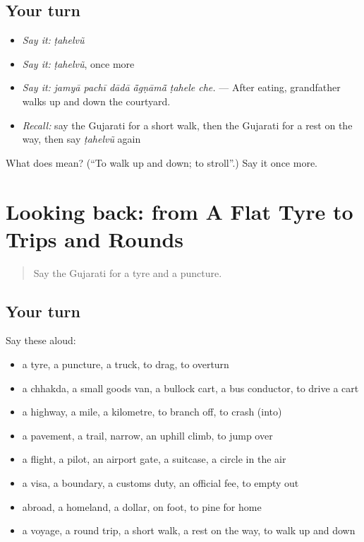\subsection*{Your turn}
\begin{itemize}
\raggedright
  \item \emph{Say it:} \emph{ṭahelvũ}
  \item \emph{Say it:} \emph{ṭahelvũ}, once more
  \item \emph{Say it:} \emph{jamyā pachī dādā ā̃gṇāmā̃ ṭahele che.} — After eating, grandfather walks up and down the courtyard.
  \item \emph{Recall:} say the Gujarati for a short walk, then the Gujarati for a rest on the way, then say \emph{ṭahelvũ} again
\end{itemize}

\begin{tcolorbox}[breakable,colback=teal!4,colframe=teal!35!black,title={Before you move on}]
What does  mean? (\textquotedblleft{}To walk up and down; to stroll\textquotedblright{}.) Say it once more.
\end{tcolorbox}
\section[(dialogue)]{Looking back: from A Flat Tyre to Trips and Rounds}

\label{lesson:GU-R408-review-401-408}



\begin{quote}
Say the Gujarati for a tyre and a puncture.
\end{quote}

\subsection*{Your turn}
Say these aloud:

\begin{itemize}
\raggedright
  \item a tyre, a puncture, a truck, to drag, to overturn
  \item a chhakda, a small goods van, a bullock cart, a bus conductor, to drive a cart
  \item a highway, a mile, a kilometre, to branch off, to crash (into)
  \item a pavement, a trail, narrow, an uphill climb, to jump over
  \item a flight, a pilot, an airport gate, a suitcase, a circle in the air
  \item a visa, a boundary, a customs duty, an official fee, to empty out
  \item abroad, a homeland, a dollar, on foot, to pine for home
  \item a voyage, a round trip, a short walk, a rest on the way, to walk up and down
\end{itemize}

